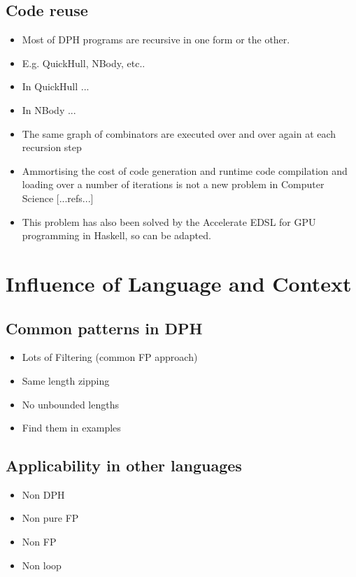 \documentclass[preamble.tex]{subfiles}
\begin{document}
\subsection{Code reuse}
\begin{itemize}
\item Most of DPH programs are recursive in one form or the other.
\item E.g. QuickHull, NBody, etc..
\item In QuickHull ...
\item In NBody ...
\item The same graph of combinators are executed over and over again at each recursion step
\item Ammortising the cost of code generation and runtime code compilation and loading over a number of iterations is not a new problem in Computer Science [...refs...]
\item This problem has also been solved by the Accelerate EDSL for GPU programming in Haskell, so can be adapted.
\end{itemize}

\pagebreak
\section{Influence of Language and Context}

\subsection{Common patterns in DPH}
\begin{itemize}
\item Lots of Filtering (common FP approach)
\item Same length zipping
\item No unbounded lengths
\item Find them in examples
\end{itemize}

\subsection{Applicability in other languages}
\begin{itemize}
\item Non DPH
\item Non pure FP
\item Non FP
\item Non loop
\end{itemize}
\end{document}
